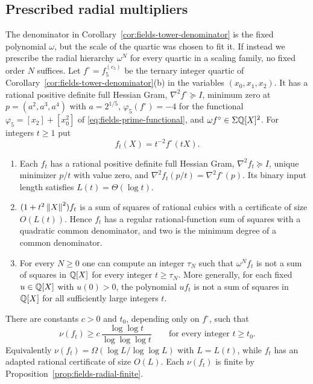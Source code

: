 \subsection{Prescribed radial multipliers}
\label{sec:fields-radial}

The denominator in Corollary~\ref{cor:fields-tower-denominator} is the fixed
polynomial $\omega$, but the scale of the quartic was chosen to fit it. If
instead we prescribe the radial hierarchy $\omega^N$ for every quartic in a
scaling family, no fixed order $N$ suffices. Let $f^\circ=f_5^{(c_5)}$ be
the ternary integer quartic of Corollary~\ref{cor:fields-tower-denominator}(b)
in the variables $(x_0,x_1,x_2)$. It has a rational positive definite full
Hessian Gram, $\nabla^2f^\circ\succeq I$, minimum zero at
$p=(a^2,a^3,a^4)$ with $a=2^{1/5}$, $\varphi_5(f^\circ)=-4$ for the
functional $\varphi_5=[x_2]+[x_0^2]$ of
\eqref{eq:fields-prime-functional}, and $\omega f^\circ\in\Sigma\mathbb Q[X]^2$. For
integers $t\ge1$ put
\[
 f_t(X)=t^{-2}f^\circ(tX).
\]

\begin{theorem}
\label{thm:fields-radial}
\leavevmode
\begin{enumerate}[label=(\alph*)]
\item Each $f_t$ has a rational positive definite full Hessian Gram,
  $\nabla^2f_t\succeq I$, unique minimizer $p/t$ with value zero, and
  $\nabla^2f_t(p/t)=\nabla^2f^\circ(p)$. Its binary input length satisfies
  $L(t)=\Theta(\log t)$.
\item $(1+t^2\left\lVert X\right\rVert^2)f_t$ is a sum of squares of rational cubics with a
  certificate of size $O(L(t))$. Hence $f_t$ has a regular rational-function
  sum of squares with a quadratic common denominator, and two is the minimum
  degree of a common denominator.
\item For every $N\ge0$ one can compute an integer $\tau_N$ such that
  $\omega^Nf_t$ is not a sum of squares in $\mathbb Q[X]$ for every integer
  $t\ge\tau_N$. More generally, for each fixed $u\in\mathbb Q[X]$ with $u(0)>0$, the
  polynomial $uf_t$ is not a sum of squares in $\mathbb Q[X]$ for all sufficiently
  large integers $t$.
\end{enumerate}
\end{theorem}

\begin{theorem}
\label{thm:fields-radial-height}
There are constants $c>0$ and $t_0$, depending only on $f^\circ$, such that
\[
 \nu(f_t)\ge c\,\frac{\log\log t}{\log\log\log t}
 \qquad\text{for every integer }t\ge t_0 .
\]
Equivalently $\nu(f_t)=\Omega(\log L/\log\log L)$ with $L=L(t)$, while
$f_t$ has an adapted rational certificate of size $O(L)$. Each $\nu(f_t)$ is
finite by Proposition~\ref{prop:fields-radial-finite}.
\end{theorem}

